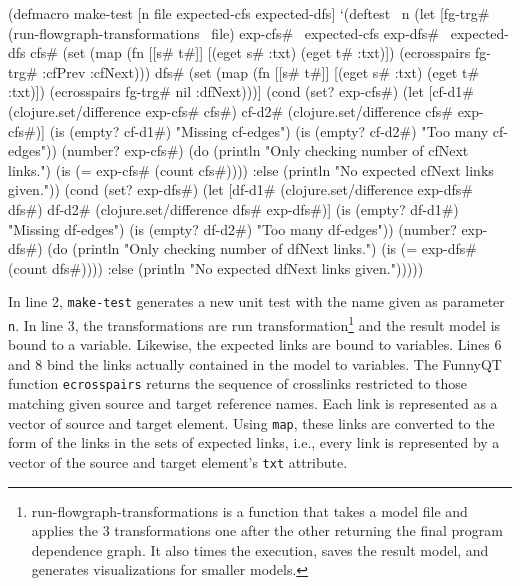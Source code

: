\documentclass[11pt]{article}
\begin{document}
\begin{clojurecode}
(defmacro make-test [n file expected-cfs expected-dfs]
  `(deftest ~n
     (let [fg-trg# (run-flowgraph-transformations ~file)
           exp-cfs# ~expected-cfs
           exp-dfs# ~expected-dfs
           cfs# (set (map (fn [[s# t#]] [(eget s# :txt) (eget t# :txt)])
                          (ecrosspairs fg-trg# :cfPrev :cfNext)))
           dfs# (set (map (fn [[s# t#]] [(eget s# :txt) (eget t# :txt)])
                          (ecrosspairs fg-trg# nil :dfNext)))]
       (cond
        (set? exp-cfs#) (let [cf-d1# (clojure.set/difference exp-cfs# cfs#)
                              cf-d2# (clojure.set/difference cfs# exp-cfs#)]
                          (is (empty? cf-d1#) "Missing cf-edges")
                          (is (empty? cf-d2#) "Too many cf-edges"))
        (number? exp-cfs#) (do
                             (println "Only checking number of cfNext links.")
                             (is (= exp-cfs# (count cfs#))))
        :else (println "No expected cfNext links given."))
       (cond
        (set? exp-dfs#) (let [df-d1# (clojure.set/difference exp-dfs# dfs#)
                              df-d2# (clojure.set/difference dfs# exp-dfs#)]
                          (is (empty? df-d1#) "Missing df-edges")
                          (is (empty? df-d2#) "Too many df-edges"))
        (number? exp-dfs#) (do
                             (println "Only checking number of dfNext links.")
                             (is (= exp-dfs# (count dfs#))))
        :else (println "No expected dfNext links given.")))))
\end{clojurecode}

In line 2, \verb|make-test| generates a new unit test with the name given as
parameter \verb|n|.  In line 3, the transformations are run
transformation\footnote{\textsf{run-flowgraph-transformations} is a function
  that takes a model file and applies the 3 transformations one after the other
  returning the final program dependence graph.  It also times the execution,
  saves the result model, and generates visualizations for smaller models.} and
the result model is bound to a variable.  Likewise, the expected links are
bound to variables.  Lines 6 and 8 bind the links actually contained in the
model to variables.  The FunnyQT function \verb|ecrosspairs| returns the
sequence of crosslinks restricted to those matching given source and target
reference names.  Each link is represented as a vector of source and target
element.  Using \verb|map|, these links are converted to the form of the links
in the sets of expected links, i.e., every link is represented by a vector of
the source and target element's \verb|txt| attribute.
\end{document}
